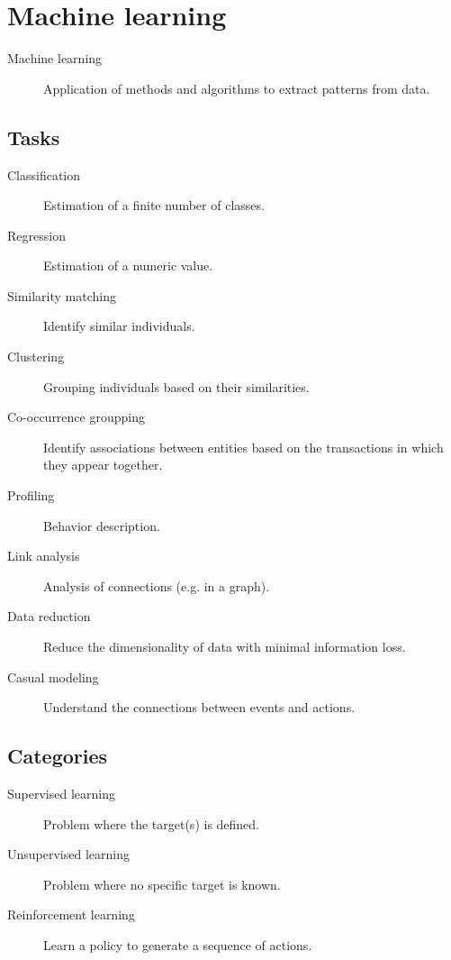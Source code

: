 \chapter{Machine learning}

\begin{description}
    \item[Machine learning] 
        Application of methods and algorithms to extract patterns from data.
\end{description}

\section{Tasks}
\begin{description}
    \item[Classification] Estimation of a finite number of classes.
    \item[Regression] Estimation of a numeric value.
    \item[Similarity matching] Identify similar individuals.
    \item[Clustering] Grouping individuals based on their similarities.
    \item[Co-occurrence groupping] Identify associations between entities based on the transactions in which they appear together.
    \item[Profiling] Behavior description.
    \item[Link analysis] Analysis of connections (e.g. in a graph).
    \item[Data reduction] Reduce the dimensionality of data with minimal information loss.
    \item[Casual modeling] Understand the connections between events and actions.  
\end{description}


\section{Categories}
\begin{description}
    \item[Supervised learning] 
        Problem where the target(s) is defined.
    \item[Unsupervised learning] 
        Problem where no specific target is known.
    \item[Reinforcement learning] 
        Learn a policy to generate a sequence of actions.
\end{description}



